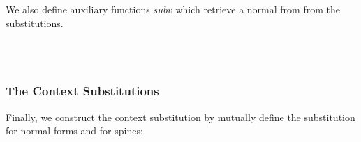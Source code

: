 We also define auxiliary functions $subv$ which retrieve a normal from from the substitutions.

\begin{code}%
\>[0]\AgdaSpace{}%
\AgdaSymbol{:}\AgdaSpace{}%
\AgdaSpace{}%
\AgdaSpace{}%
\AgdaSpace{}%
\AgdaSpace{}%
\AgdaSpace{}%
\AgdaSpace{}%
\AgdaSpace{}%
\AgdaSpace{}%
\AgdaSpace{}%
\AgdaSpace{}%
\<%
\\
\>[0]\AgdaSpace{}%
\AgdaSpace{}%
\AgdaSymbol{(}\AgdaSpace{}%
\AgdaOperator{\AgdaInductiveConstructor{,}}\AgdaSpace{}%
\AgdaSymbol{)}\AgdaSpace{}%
\AgdaSymbol{=}\AgdaSpace{}%
\<%
\\
\>[0]\AgdaSpace{}%
\AgdaSymbol{(}\AgdaSpace{}%
\AgdaSymbol{)}\AgdaSpace{}%
\AgdaSymbol{(}\AgdaSpace{}%
\AgdaOperator{\AgdaInductiveConstructor{,}}\AgdaSpace{}%
\AgdaSymbol{)}\AgdaSpace{}%
\AgdaSymbol{=}\AgdaSpace{}%
\AgdaSpace{}%
\AgdaSpace{}%
\<%
\end{code}

\subsubsection*{The Context Substitutions}

Finally, we construct the context substitution by mutually define the substitution for normal forms and for spines:

\begin{code}[hide]%
\>[0]\<%
\end{code}

